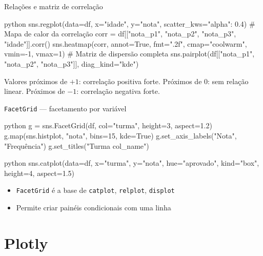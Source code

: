 \documentclass[xcolor=dvipsnames,t,aspectratio=169]{beamer}
\newcommand{\highlight}[1]{{\color{nes_dark_orange} #1}}
\begin{document}
\begin{frame}[c, fragile]{Relações e matriz de correlação}

\begin{code}{python}
sns.regplot(data=df, x="idade", y="nota", scatter_kws={"alpha": 0.4})
# Mapa de calor da correlação
corr = df[["nota_p1", "nota_p2", "nota_p3", "idade"]].corr()
sns.heatmap(corr, annot=True, fmt=".2f",
            cmap="coolwarm", vmin=-1, vmax=1)
# Matriz de dispersão completa
sns.pairplot(df[["nota_p1", "nota_p2", "nota_p3"]], diag_kind="kde")
\end{code}

\begin{display}
Valores próximos de $+1$: correlação positiva forte.
Próximos de $0$: sem relação linear.
Próximos de $-1$: correlação negativa forte.
\end{display}

\end{frame}


\begin{frame}[c, fragile]{\texttt{FacetGrid} — facetamento por variável}

\begin{code}{python}
g = sns.FacetGrid(df, col="turma", height=3, aspect=1.2)
g.map(sns.histplot, "nota", bins=15, kde=True)
g.set_axis_labels("Nota", "Frequência")
g.set_titles("Turma {col_name}")
\end{code}

\begin{code}{python}
sns.catplot(data=df, x="turma", y="nota",
            hue="aprovado", kind="box",
            height=4, aspect=1.5)
\end{code}

\begin{itemize}
    \item \texttt{FacetGrid} é a base de \texttt{catplot}, \texttt{relplot}, \texttt{displot}
    \item Permite criar \highlight{painéis condicionais} com uma linha
\end{itemize}

\end{frame}


\section{Plotly}
\end{document}
